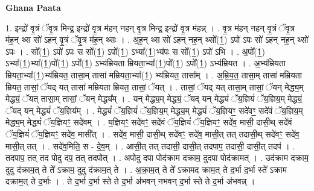\documentclass[17pt]{extarticle}
\begin{document}
\textbf{Ghana Paata } \newline

1. इन्द्रो॑ वृ॒त्रं ॅवृ॒त्र मिन्द्र॒ इन्द्रो॑ वृ॒त्र म॑हन् नहन् वृ॒त्र मिन्द्र॒ इन्द्रो॑ वृ॒त्र म॑हन्न् । . वृ॒त्र म॑हन् नहन् वृ॒त्रं ॅवृ॒त्र म॑ह॒न् थ्स सो॑ ऽहन् वृ॒त्रं ॅवृ॒त्र म॑ह॒न् थ्सः । . अ॒ह॒न् थ्स सो॑ ऽहन् नह॒न् थ्सो᳚(1॒) ऽपो॑ ऽपः सो॑ ऽहन् नह॒न् थ्सो॑ ऽपः । . सो᳚(1॒) ऽपो॑ ऽपः स सो᳚(1॒) ऽपो᳚(1॒) ऽभ्या᳚(1॒)भ्य॑पः स सो᳚(1॒) ऽपो॑ ऽभि । . अ॒पो᳚(1॒) ऽभ्या᳚(1॒)भ्या᳚(1॒)पो᳚(1॒) ऽपो᳚(1॒) ऽभ्य॑म्रियता म्रियता॒भ्या᳚(1॒)पो᳚(1॒) ऽपो᳚(1॒) ऽभ्य॑म्रियत । . अ॒भ्य॑म्रियता म्रियता॒भ्या᳚(1॒)भ्य॑म्रियत॒ तासा॒म् तासा॑ मम्रियता॒भ्या᳚(1॒) भ्य॑म्रियत॒ तासा᳚म् । . अ॒म्रि॒य॒त॒ तासा॒म् तासा॑ मम्रियता म्रियत॒ तासां॒ ॅयद् यत् तासा॑ मम्रियता म्रियत॒ तासां॒ ॅयत् । . तासां॒ ॅयद् यत् तासा॒म् तासां॒ ॅयन् मेद्ध्य॒म् मेद्ध्यं॒ ॅयत् तासा॒म् तासां॒ ॅयन् मेद्ध्य᳚म् । . यन् मेद्ध्य॒म् मेद्ध्यं॒ ॅयद् यन् मेद्ध्यं॑ ॅय॒ज्ञियं॑ ॅय॒ज्ञिय॒म् मेद्ध्यं॒ ॅयद् यन् मेद्ध्यं॑ ॅय॒ज्ञिय᳚म् । . मेद्ध्यं॑ ॅय॒ज्ञियं॑ ॅय॒ज्ञिय॒म् मेद्ध्य॒म् मेद्ध्यं॑ ॅय॒ज्ञियꣳ॒॒ सदे॑वꣳ॒॒ सदे॑वं ॅय॒ज्ञिय॒म् मेद्ध्य॒म् मेद्ध्यं॑ ॅय॒ज्ञियꣳ॒॒ सदे॑वम् । . य॒ज्ञियꣳ॒॒ सदे॑वꣳ॒॒ सदे॑वं ॅय॒ज्ञियं॑ ॅय॒ज्ञियꣳ॒॒ सदे॑व॒ मासी॒ दासी॒थ् सदे॑वं ॅय॒ज्ञियं॑ ॅय॒ज्ञियꣳ॒॒ सदे॑व॒ मासी᳚त् । . सदे॑व॒ मासी॒ दासी॒थ् सदे॑वꣳ॒॒ सदे॑व॒ मासी॒त् तत् तदासी॒थ् सदे॑वꣳ॒॒ सदे॑व॒ मासी॒त् तत् । . सदे॑व॒मिति॒ स - दे॒व॒म् । . आसी॒त् तत् तदासी॒ दासी॒त् तदपाप॒ तदासी॒ दासी॒त् तदप॑ । . तदपाप॒ तत् तद पोदु दप॒ तत् तदपोत् । . अपोदु दपा पोद॑क्राम दक्राम॒ दुदपा पोद॑क्रामत् । . उद॑क्राम दक्राम॒ दुदु द॑क्राम॒त् ते ते᳚ ऽक्राम॒ दुदु द॑क्राम॒त् ते । . अ॒क्रा॒म॒त् ते ते᳚ ऽक्रामद क्राम॒त् ते द॒र्भा द॒र्भा स्ते᳚ ऽक्राम दक्राम॒त् ते द॒र्भाः । . ते द॒र्भा द॒र्भा स्ते ते द॒र्भा अ॑भवन् नभवन् द॒र्भा स्ते ते द॒र्भा अ॑भवन्न् । \newline
\end{document}
